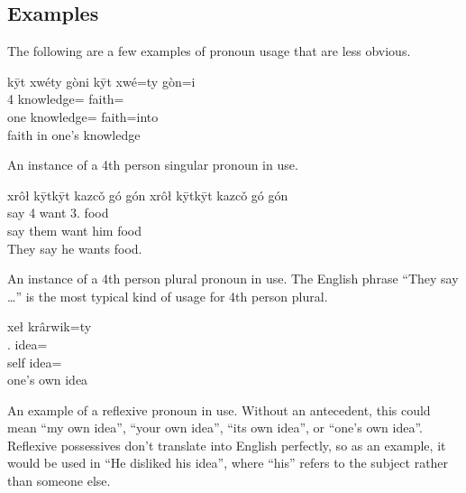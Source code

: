 \subsection{Examples}\label{subsec:examples}

The following are a few examples of pronoun usage
that are less obvious.

\begin{exe}
    \ex
    \glt
    kȳt xwéty gòni
    \glll
    kȳt xwé=ty gòn=i \\
    4\Sg{} knowledge=\Poss{} faith=\IllThree{} \\
    one knowledge=\Poss{} faith=into \\
    \glt
    faith in one's knowledge
\end{exe}
An instance of a 4th person singular pronoun in use.

\begin{exe}
    \ex
    xrôł kȳtkȳt kazcǒ gó gón
    \glll
    xrôł kȳtkȳt kazcǒ gó gón \\
    say 4\Pl{} want 3\Sg{}.\Anim{} food \\
    say them want him food \\
    \glt
    They say he wants food.
\end{exe}
An instance of a 4th person plural pronoun in use.
The English phrase ``They say \dots'' is the most typical
kind of usage for 4th person plural.

\begin{exe}
    \ex
    \glll
    xeł krârwik=ty  \\
    \Refl{}.\Sg{} idea=\Poss{} \\
    self idea=\Poss{} \\
    \glt
    one's own idea
\end{exe}
An example of a reflexive pronoun in use.
Without an antecedent, this could mean
``my own idea'',
``your own idea'',
``its own idea'',
or
``one's own idea''.
Reflexive possessives don't translate into English perfectly,
so as an example,
it would be used in
``He disliked his idea'',
where ``his'' refers to the subject rather than someone else.


